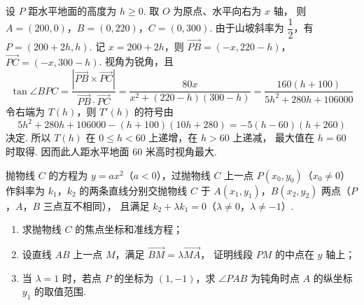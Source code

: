 \begin{solution}
设 \(P\) 距水平地面的高度为 \(h\geqslant0\). 取 \(O\) 为原点、水平向右为 \(x\) 轴，
则 \(A=(200,0)\)，\(B=(0,220)\)，\(C=(0,300)\). 由于山坡斜率为
\(\dfrac12\)，有 \(P=(200+2h,h)\). 记 \(x=200+2h\)，则
\(\overrightarrow{PB}=(-x,220-h)\)，\(\overrightarrow{PC}=(-x,300-h)\).
视角为锐角，且
\[
\tan\angle BPC
=\frac{|\overrightarrow{PB}\times\overrightarrow{PC}|}
{\overrightarrow{PB}\cdot\overrightarrow{PC}}
=\frac{80x}{x^2+(220-h)(300-h)}
=\frac{160(h+100)}{5h^2+280h+106000}
\]
令右端为 \(T(h)\)，则 \(T'(h)\) 的符号由
\[
5h^2+280h+106000-(h+100)(10h+280)
=-5(h-60)(h+260)
\]
决定. 所以 \(T(h)\) 在 \(0\leqslant h<60\) 上递增，在 \(h>60\) 上递减，
最大值在 \(h=60\) 时取得. 因而此人距水平地面 \(60\) 米高时视角最大.
\end{solution}

\begin{problem}
抛物线 \(C\) 的方程为 \(y=ax^2\)（\(a<0\)），过抛物线 \(C\) 上一点
\(P(x_0,y_0)\)（\(x_0\ne0\)）作斜率为 \(k_1\)，\(k_2\) 的两条直线分别交抛物线
\(C\) 于 \(A(x_1,y_1)\)，\(B(x_2,y_2)\) 两点（\(P\)，\(A\)，\(B\) 三点互不相同），
且满足 \(k_2+\lambda k_1=0\)（\(\lambda\ne0\)，\(\lambda\ne-1\)）.

\begin{enumerate}
\item 求抛物线 \(C\) 的焦点坐标和准线方程；
\item 设直线 \(AB\) 上一点 \(M\)，满足 \(\overrightarrow{BM}=\lambda\overrightarrow{MA}\)，
证明线段 \(PM\) 的中点在 \(y\) 轴上；
\item 当 \(\lambda=1\) 时，若点 \(P\) 的坐标为 \((1,-1)\)，求
\(\angle PAB\) 为钝角时点 \(A\) 的纵坐标 \(y_1\) 的取值范围.
\end{enumerate}
\end{problem}

